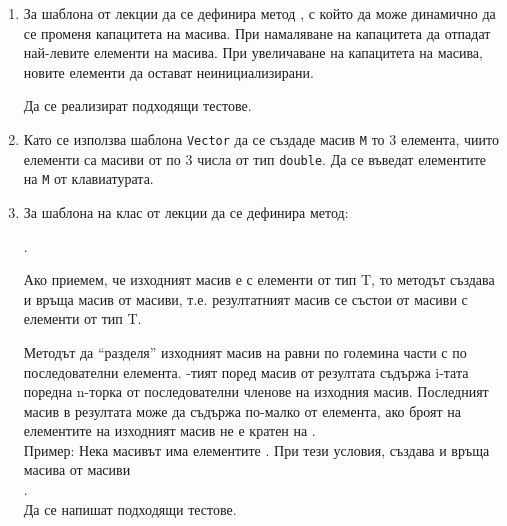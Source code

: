 \begin{enumerate}[resume]
\item За шаблона  от лекции да се дефинира метод , с който да може динамично да се променя капацитета на масива. При намаляване на капацитета да отпадат най-левите елементи на масива. При увеличаване на капацитета на масива, новите елементи да остават неинициализирани.

Да се реализират подходящи тестове.

\item \label{zad:vectm} Като се използва шаблона \texttt{Vector} да се създаде масив \texttt{M} то 3 елемента, чиито елементи са масиви от по 3 числа от тип \texttt{double}. Да се въведат елементите на \texttt{M} от клавиатурата.


\item За шаблона на клас  от лекции да се дефинира метод:

 .

 Ако приемем, че изходният масив е  с елементи от тип T, то методът  създава и връща масив от масиви, т.е. резултатният масив се състои от масиви с елементи от тип T.

 Методът да ``разделя'' изходният масив на равни по големина части с по  последователни елемента. -тият поред масив от резултата съдържа i-тата поредна n-торка от последователни членове на изходния масив. Последният масив в резултата може да съдържа по-малко от  елемента, ако броят на елементите на изходният масив не е кратен на .\\

Пример: Нека масивът  има елементите \code{[1,2,3,4,5,6,7,8,10,11]}. При тези условия,  създава и връща масива от масиви\\ \code{[[1,2,3],[4,5,6],[7,8,9],[10,11]]}.\\


Да се напишат подходящи тестове.



\end{enumerate}


